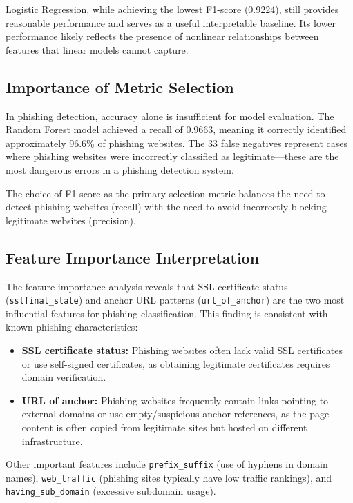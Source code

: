 \documentclass[conference]{IEEEtran}
\begin{document}
Logistic Regression, while achieving the lowest F1-score (0.9224), still provides reasonable performance and serves as a useful interpretable baseline. Its lower performance likely reflects the presence of nonlinear relationships between features that linear models cannot capture.

\subsection{Importance of Metric Selection}

In phishing detection, accuracy alone is insufficient for model evaluation. The Random Forest model achieved a recall of 0.9663, meaning it correctly identified approximately 96.6\% of phishing websites. The 33 false negatives represent cases where phishing websites were incorrectly classified as legitimate---these are the most dangerous errors in a phishing detection system.

The choice of F1-score as the primary selection metric balances the need to detect phishing websites (recall) with the need to avoid incorrectly blocking legitimate websites (precision).

\subsection{Feature Importance Interpretation}

The feature importance analysis reveals that SSL certificate status (\texttt{sslfinal\_state}) and anchor URL patterns (\texttt{url\_of\_anchor}) are the two most influential features for phishing classification. This finding is consistent with known phishing characteristics:

\begin{itemize}
    \item \textbf{SSL certificate status:} Phishing websites often lack valid SSL certificates or use self-signed certificates, as obtaining legitimate certificates requires domain verification.
    \item \textbf{URL of anchor:} Phishing websites frequently contain links pointing to external domains or use empty/suspicious anchor references, as the page content is often copied from legitimate sites but hosted on different infrastructure.
\end{itemize}

Other important features include \texttt{prefix\_suffix} (use of hyphens in domain names), \texttt{web\_traffic} (phishing sites typically have low traffic rankings), and \texttt{having\_sub\_domain} (excessive subdomain usage).
\end{document}
